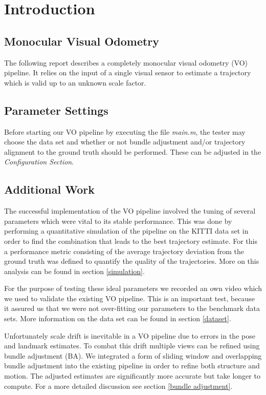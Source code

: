 \chapter{Introduction}
\section{Monocular Visual Odometry}
The following report describes a completely monocular visual odometry (VO) pipeline. It relies on the input of a single visual sensor to estimate a trajectory which is valid up to an unknown scale factor.

\section{Parameter Settings}
\label{params}
Before starting our VO pipeline by executing the file \emph{main.m}, the tester may choose the data set and whether or not bundle adjustment and/or trajectory alignment to the ground truth should be performed. These can be adjusted in the \emph{Configuration Section}.

\section{Additional Work}
The successful implementation of the VO pipeline involved the tuning of several parameters which were vital to its stable performance. This was done by performing a quantitative simulation of the pipeline on the KITTI data set in order to find the combination that leads to the best trajectory estimate. For this a performance metric consisting of the average trajectory deviation from the ground truth was defined to quantify the quality of the trajectories. More on this analysis can be found in section \ref{simulation}. \par
For the purpose of testing these ideal parameters we recorded an own video which we used to validate the existing VO pipeline. This is an important test, because it assured us that we were not over-fitting our parameters to the benchmark data sets. More information on the data set can be found in section \ref{dataset}. \par
Unfortunately scale drift is inevitable in a VO pipeline due to errors in the pose and landmark estimates. To combat this drift multiple views can be refined using bundle adjustment (BA). We integrated a form of sliding window and overlapping bundle adjustment into the existing pipeline in order to refine both structure and motion. The adjusted estimates are significantly more accurate but take longer to compute. For a more detailed discussion see section \ref{bundle adjustment}.
